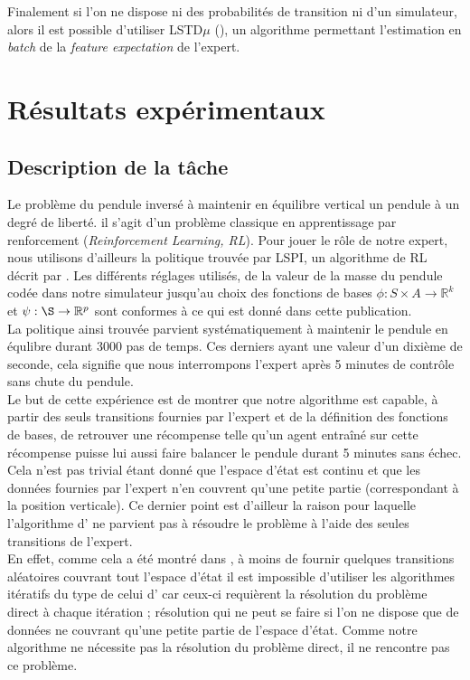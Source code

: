 \documentclass[publibook-draft]{CAp2012}
\begin{document}
Finalement si l'on ne dispose ni des probabilités de transition ni d'un simulateur, alors il est possible d'utiliser LSTD$\mu$ (\citep{klein2011batch}), un algorithme permettant l'estimation en {\it batch} de la {\it feature expectation} de l'expert.
\section{Résultats expérimentaux}
\subsection{Description de la tâche}
Le problème du pendule inversé à maintenir en équilibre vertical un pendule à un degré de liberté. il s'agit d'un problème classique en apprentissage par renforcement ({\it Reinforcement Learning, RL}). Pour jouer le rôle de notre expert, nous utilisons d'ailleurs la politique trouvée par LSPI, un algorithme de RL décrit par \citet{lagoudakis2003least}. Les différents réglages utilisés, de la valeur de la masse du pendule codée dans notre simulateur jusqu'au choix des fonctions de bases $\phi : S\times A \rightarrow \mathbb{R}^k$ et $\psi : \S \rightarrow \mathbb{R}^p$ sont conformes à ce qui est donné dans cette publication.\\

La politique ainsi trouvée parvient systématiquement à maintenir le pendule en équlibre durant 3000 pas de temps. Ces derniers ayant une valeur d'un dixième de seconde, cela signifie que nous interrompons l'expert après 5 minutes de contrôle sans chute du pendule.\\

Le but de cette expérience est de montrer que notre algorithme est capable, à partir des seuls transitions fournies par l'expert et de la définition des fonctions de bases, de retrouver une récompense telle qu'un agent entraîné sur cette récompense puisse lui aussi faire balancer le pendule durant 5 minutes sans échec. Cela n'est pas trivial étant donné que l'espace d'état est continu et que les données fournies par l'expert n'en couvrent qu'une petite partie (correspondant à la position verticale). Ce dernier point est d'ailleur la raison pour laquelle l'algorithme d'\citet{abbeel2004apprenticeship} ne parvient pas à résoudre le problème à l'aide des seules transitions de l'expert.\\

En effet, comme cela a été montré dans \citep{klein2011batch}, à moins de fournir quelques transitions aléatoires couvrant tout l'espace d'état il est impossible d'utiliser les algorithmes itératifs du type de celui d'\citet{abbeel2004apprenticeship} car ceux-ci requièrent la résolution du problème direct à chaque itération ; résolution qui ne peut se faire si l'on ne dispose que de données ne couvrant qu'une petite partie de l'espace d'état. Comme notre algorithme ne nécessite pas la résolution du problème direct, il ne rencontre pas ce problème.
\end{document}
